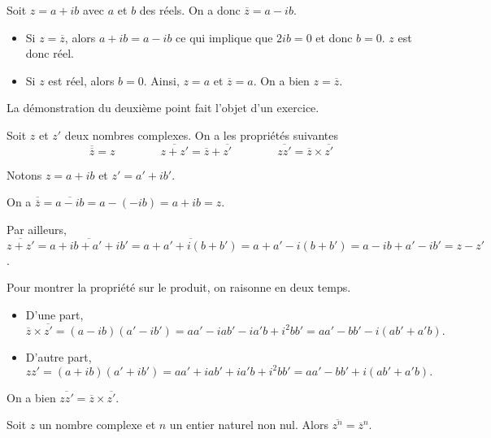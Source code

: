 \documentclass[11pt,fleqn, openany]{book} %
\begin{document}
\begin{demonstration}Soit $z=a+ib$ avec $a$ et $b$ des réels. On a donc $\overline{z}=a-ib$.
\begin{itemize}
\item Si $z=\overline{z}$, alors $a+ib=a-ib$ ce qui implique que $2ib=0$ et donc $b=0$. $z$ est donc réel.
\item Si $z$ est réel, alors $b=0$. Ainsi, $z=a$ et $\overline{z}=a$. On a bien $z=\overline{z}$.
\end{itemize}\end{demonstration}

La démonstration du deuxième point fait l'objet d'un exercice.

\begin{proposition}Soit $z$ et $z'$ deux nombres complexes. On a les propriétés suivantes
\[\overline{\overline{z}} = z \qquad \qquad \overline{z+z'}=\overline{z}+\overline{z'} \qquad \qquad \overline{zz'}=\overline{z}\times \overline{z'}\]
\end{proposition}

\begin{demonstration}Notons $z=a+ib$ et $z'=a'+ib'$.

On a $\overline{\overline{z}} = \overline{a-ib}=a-(-ib)=a+ib=z$.

Par ailleurs, $\overline{z+z'} = \overline{a+ib+a'+ib'}=\overline{a+a'+i(b+b')}=a+a'-i(b+b')=a-ib+a'-ib'=z-z'$.

Pour montrer la propriété sur le produit, on raisonne en deux temps.
\begin{itemize}
\item D'une part, \[\overline{z} \times \overline{z'}=(a-ib)(a'-ib')=aa'-iab'-ia'b+i^2bb'=aa'-bb'-i(ab'+a'b).\]
 \item D'autre part, 
 \[zz'=(a+ib)(a'+ib')=aa'+iab'+ia'b+i^2bb'=aa'-bb'+i(ab'+a'b).\]
\end{itemize}
 On a bien $\overline{zz'}=\overline{z}\times \overline{z'}$.\end{demonstration}



\begin{proposition}Soit $z$ un nombre complexe et $n$ un entier naturel non nul. Alors $\overline{z^n}=\overline{z}^n$.\end{proposition}
\end{document}
